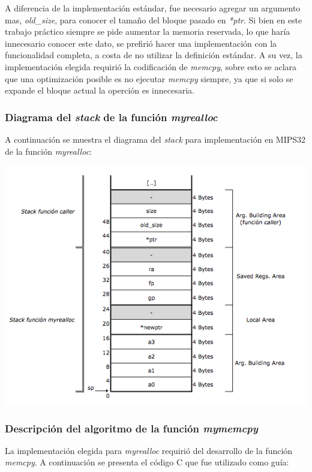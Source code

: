 \documentclass[a4paper,10pt]{article}
\begin{document}
A diferencia de la implementaci\'on est\'andar, fue necesario agregar un argumento mas, \textit{old\_size}, para conocer el tama\~no del bloque pasado en \textit{*ptr}. Si bien en este trabajo pr\'actico siempre se pide aumentar la memoria reservada, lo que har\'ia innecesario conocer este dato, se prefiri\'o hacer una implementaci\'on con la funcionalidad completa, a costa de no utilizar la definici\'on est\'andar. A su vez, la implementaci\'on elegida requiri\'o la codificaci\'on de \textit{memcpy}, sobre esto se aclara que una optimizaci\'on posible es no ejecutar \textit{memcpy} siempre, ya que si solo se expande el bloque actual la operci\'on es innecesaria.  

\subsubsection{Diagrama del \textit{stack} de la funci\'on \textit{myrealloc}}
A continuaci\'on se muestra el diagrama del \textit{stack} para implementaci\'on en MIPS32 de la funci\'on \textit{myrealloc}:

\begin{center}
\includegraphics[scale=0.50]{stack_myrealloc.png}
\end{center}

\pagebreak

\subsubsection{Descripci\'on del algoritmo de la funci\'on \textit{mymemcpy}}
La implementaci\'on elegida para \textit{myrealloc} requiri\'o del desarrollo de la funci\'on \textit{memcpy}. A continuaci\'on se presenta el c\'odigo C que fue utilizado como gu\'ia:
\end{document}
